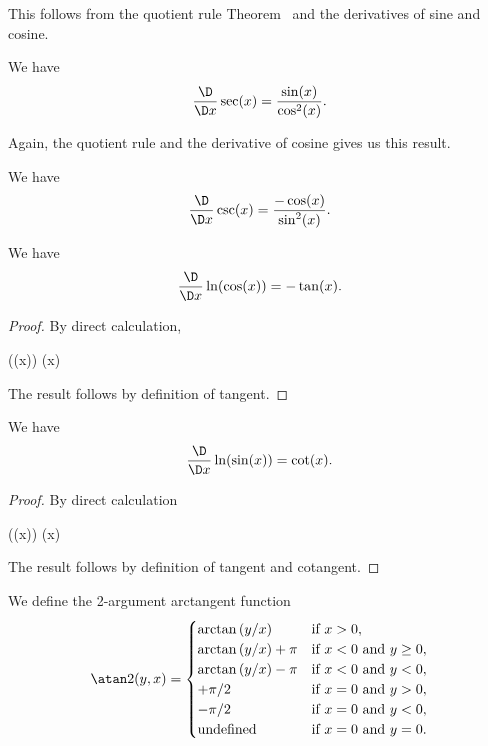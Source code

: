 \begin{node}[Trigonometry]
This follows from the quotient rule Theorem~ and the
derivatives of sine and cosine.

\begin{node}\label{calculus-0012}%
  We have
  \[\frac{\D}{\D x}\sec(x)=\frac{\sin(x)}{\cos^{2}(x)}.\]
\end{node}

Again, the quotient rule and the derivative of cosine gives us this result.

\begin{node}\label{calculus-0013}%
  We have
  \[\frac{\D}{\D x}\csc(x)=\frac{-\cos(x)}{\sin^{2}(x)}.\]
\end{node}

\begin{node}\label{calculus-0014}%
  We have
  \[\frac{\D}{\D x}\ln(\cos(x))=-\tan(x).\]
\end{node}

\begin{proof}
By direct calculation,
\begin{calculation}
  \ln(\cos(x))
  \cos(x)
\end{calculation}
The result follows by definition of tangent.
\end{proof}

\begin{node}\label{calculus-0015}%
We have
\[\frac{\D}{\D x}\ln(\sin(x))=\cot(x).\]
\end{node}

\begin{proof}
By direct calculation
\begin{calculation}
  \ln(\sin(x))
  \sin(x)
\end{calculation}
The result follows by definition of tangent and cotangent.
\end{proof}

\begin{definition}\label{calculus-0017}%
We define the 2-argument arctangent function
\begin{equation}
\atan2(y, x) =
\begin{cases}
 \arctan\left(y/x\right) &\mbox{if } x > 0, \\
 \arctan\left(y/x\right) + \pi &\mbox{if } x < 0 \mbox{ and } y \geq 0, \\
 \arctan\left(y/x\right) - \pi &\mbox{if } x < 0 \mbox{ and } y < 0, \\
 +\pi/2 &\mbox{if } x = 0 \mbox{ and } y > 0, \\
 -\pi/2 &\mbox{if } x = 0 \mbox{ and } y < 0, \\
 \mbox{undefined} &\mbox{if } x = 0 \mbox{ and } y = 0.
\end{cases}
\end{equation}
\end{definition}

\end{node} %


